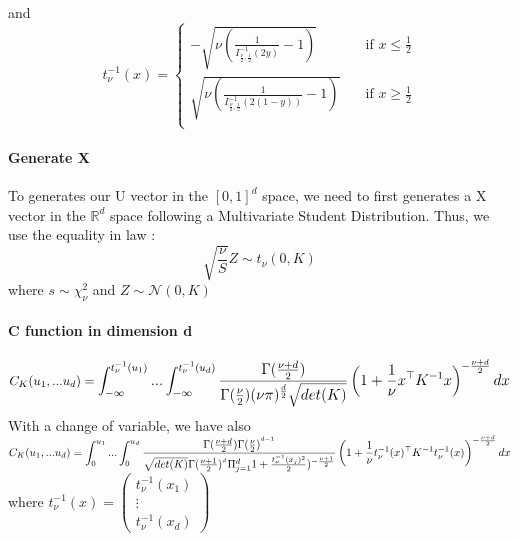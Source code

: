 \documentclass{article}
\begin{document}
  	and \newline
  	\[
   		t_\nu^{-1} (x) =  \begin{cases}
        -\sqrt{\nu (\frac{1}{I^{-1}_{\frac{\nu}{2},\frac{1}{2}}(2y)}-1)}  & \quad \text{if } x \leq \frac{1}{2} \\
    	\sqrt{\nu (\frac{1}{I^{-1}_{\frac{\nu}{2},\frac{1}{2}}(2(1-y))}-1)}  & \quad \text{if } x \geq \frac{1}{2}\\
  	\end{cases}
  	\]

	\paragraph{Generate X}
	To generates our U vector in the $[0,1]^d$ space, we need to first generates a X vector in the $\mathbb{R}^d$ space following a Multivariate Student Distribution. Thus, we use the equality in law :
	\begin{equation*}
	\sqrt{\frac{\nu}{S}} Z \sim t_\nu (0,K)
	\end{equation*}
	where $s \sim \chi_\nu^2$ and $Z \sim \mathcal{N} (0,K)$
	
	\paragraph{C function in dimension d}
	
	
	\begin{equation*}
	 C_{K}(u_{1},...u_{d})= \mathlarger{ \int_{-\infty}^{t_\nu^{-1}(u_{1})}...\int_{-\infty}^{t_\nu^{-1}(u_{d})} \frac{\Gamma (\frac{\nu +d}{2})}{\Gamma
	 (\frac{\nu}{2})(\nu \pi)^{\frac{d}{2}}\sqrt{det(K)}}\left(1+\frac{1}{\nu}x^\top K^{-1} x \right)^{-\frac{\nu +d}{2}}dx}
	\end{equation*}
	\newline
	\newline
	With a change of variable, we have also \newline
	\newline
	\begin{math}
	C_{K}(u_{1},...u_{d})=  \mathlarger{ \int_{0}^{u_{1}}...\int_{0}^{u_{d}} \frac{\Gamma (\frac{\nu +d}{2}) \Gamma (\frac{\nu}{2})^{^{d-1}}}{\sqrt{det(K)}\Gamma (\frac{\nu +1}{2})^{^{d}}\Pi_{j=1}^d 1+\frac{t_\nu^{-1}(x_j)^2}{2})^{-\frac{\nu+1}{2}}}\left(1+\frac{1}{\nu}t_\nu^{-1}(x)^\top K^{-1} t_\nu^{-1}(x) \right)^{-\frac{\nu +d}{2}}dx}
	\end{math}
	\newline
	\newline
	\newline
	where \begin{math} t_\nu^{-1}(x) =  \begin{pmatrix}
   t_\nu^{-1}(x_{1}) \\
  \vdots   \\
   t_\nu^{-1}(x_{d})  
 \end{pmatrix}\end{math}
 
\end{document}
